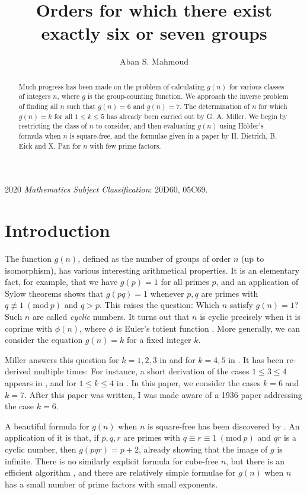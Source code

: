 \documentclass[a4paper, 12pt]{article}
\newcommand{\Mod}[1]{\ (\mathrm{mod} \ #1)}
\theoremstyle{plain}
\theoremstyle{definition}
\begin{document}
\title{Orders for which there exist exactly six or seven groups}
\author{Aban S. Mahmoud}
\maketitle

\begin{abstract}
	Much progress has been made on the problem of calculating $g(n)$ for various classes of integers $n$,  where $g$ is the group-counting function. We approach the inverse problem of finding all $n$ such that $g(n) = 6$ and $g(n) = 7$. The determination of $n$ for which $g(n) = k$ for all $1 \le k \le 5$ has already been carried out by G. A. Miller. We begin by restricting the class of $n$ to consider, and then evaluating $g(n)$ using Hölder's formula when $n$ is square-free, and the formulae given in a paper by H. Dietrich, B. Eick and X. Pan for $n$ with few prime factors.
\end{abstract}

\textup{2020} \textit{Mathematics Subject Classification}: \textup{20D60, 05C69}.

\section{Introduction}
The function $g(n)$, defined as the number of groups of order $n$ (up to isomorphism), has various interesting arithmetical properties. It is an elementary fact, for example, that we have $g(p) = 1$ for all primes $p$, and an application of Sylow theorems shows that $g(pq) = 1$ whenever $p, q$ are primes with $q \not\equiv 1 \Mod{p}$ and $q > p$. This raises the question: Which $n$ satisfy $g(n) = 1$? Such $n$ are called \emph{cyclic} numbers. It turns out that $n$ is cyclic precisely when it is coprime with $\phi(n)$, where $\phi$ is Euler's totient function {\cite{szele}}. More generally, we can consider the equation $g(n) = k$ for a fixed integer $k$.

Miller answers this question for $k = 1, 2, 3$ in {\cite{miller1}} and for $k = 4, 5$ in {\cite{miller2}}. It has been re-derived multiple times: For instance, a short derivation of the cases $1 \le 3 \le 4$ appears in {\cite{olsson}}, and for $1 \le k \le 4$ in {\cite{gnumoas}}. In this paper, we consider the cases $k = 6$ and $k = 7$. After this paper was written, I was made aware of a 1936 paper {\cite{sigley}} addressing the case $k = 6$.

A beautiful formula for $g(n)$ when $n$ is square-free has been discovered by  {\cite[Thm.~5.1]{gnumoas}}. An application of it is that, if $p, q, r$ are primes with $q \equiv r \equiv 1 \Mod{p}$ and $qr$ is a cyclic number, then $g(pqr) = p + 2$, already showing that the image of $g$ is infinite. There is no similarly explicit formula for cube-free $n$, but there is an efficient algorithm {\cite{cube-free}}, and there are relatively simple formulae for $g(n)$ when $n$ has a small number of prime factors with small exponents.
\end{document}
